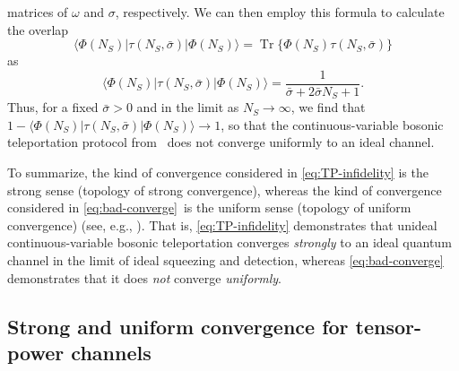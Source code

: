 \documentclass[apsrev,twocolumn]{revtex4-1}%
\begin{document}
matrices of $\omega$ and $\sigma$, respectively. We can then employ this
formula to calculate the overlap%
\begin{equation}
\langle\Phi(N_{S})|\tau(N_{S},\bar{\sigma})|\Phi(N_{S})\rangle
=\operatorname{Tr}\{\Phi(N_{S})\tau(N_{S},\bar{\sigma})\}
\end{equation}
as%
\begin{equation}
\langle\Phi(N_{S})|\tau(N_{S},\bar{\sigma})|\Phi(N_{S})\rangle=\frac{1}%
{\bar{\sigma}+2\bar{\sigma}N_{S}+1}.
\end{equation}
Thus, for a fixed $\bar{\sigma}>0$ and in the limit as $N_{S}\rightarrow
\infty$, we find that $1-\langle\Phi(N_{S})|\tau(N_{S},\bar{\sigma}%
)|\Phi(N_{S})\rangle\rightarrow1$, so that the continuous-variable bosonic
teleportation protocol from \cite{prl1998braunstein}\ does not converge
uniformly to an ideal channel.

To summarize, the kind of convergence considered in \eqref{eq:TP-infidelity}
is the strong sense (topology of strong convergence), whereas the kind of
convergence considered in \eqref{eq:bad-converge}\ is the uniform sense
(topology of uniform convergence) (see, e.g., \cite[Section~3]{SH08}). That
is, \eqref{eq:TP-infidelity} demonstrates that unideal continuous-variable
bosonic teleportation converges \textit{strongly} to an ideal quantum channel
in the limit of ideal squeezing and detection, whereas \eqref{eq:bad-converge}
demonstrates that it does \textit{not} converge \textit{uniformly}.

\subsection{Strong and uniform convergence for tensor-power channels}
\end{document}
